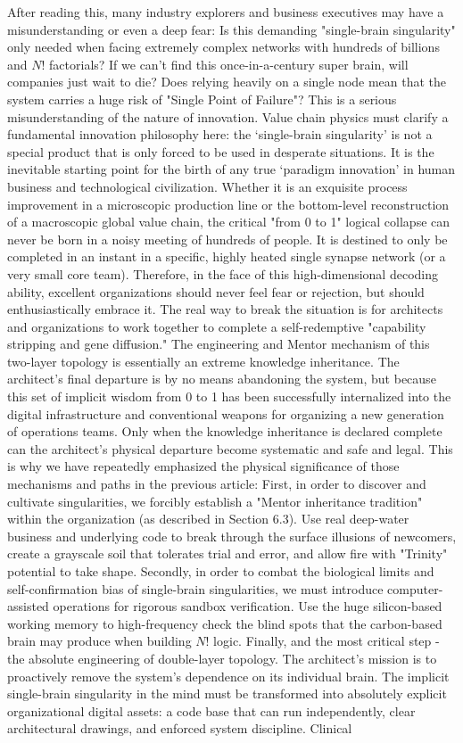 \documentclass[11pt,a4paper]{article}
\begin{document}
After reading this, many industry explorers and business executives may have a misunderstanding or even a deep fear: Is this demanding "single-brain singularity" only needed when facing extremely complex networks with hundreds of billions and $N!$ factorials? If we can’t find this once-in-a-century super brain, will companies just wait to die? Does relying heavily on a single node mean that the system carries a huge risk of "Single Point of Failure"? This is a serious misunderstanding of the nature of innovation. Value chain physics must clarify a fundamental innovation philosophy here: the ‘single-brain singularity’ is not a special product that is only forced to be used in desperate situations. It is the inevitable starting point for the birth of any true ‘paradigm innovation’ in human business and technological civilization. Whether it is an exquisite process improvement in a microscopic production line or the bottom-level reconstruction of a macroscopic global value chain, the critical "from 0 to 1" logical collapse can never be born in a noisy meeting of hundreds of people. It is destined to only be completed in an instant in a specific, highly heated single synapse network (or a very small core team). Therefore, in the face of this high-dimensional decoding ability, excellent organizations should never feel fear or rejection, but should enthusiastically embrace it. The real way to break the situation is for architects and organizations to work together to complete a self-redemptive "capability stripping and gene diffusion." The engineering and Mentor mechanism of this two-layer topology is essentially an extreme knowledge inheritance. The architect's final departure is by no means abandoning the system, but because this set of implicit wisdom from 0 to 1 has been successfully internalized into the digital infrastructure and conventional weapons for organizing a new generation of operations teams. Only when the knowledge inheritance is declared complete can the architect's physical departure become systematic and safe and legal. This is why we have repeatedly emphasized the physical significance of those mechanisms and paths in the previous article: First, in order to discover and cultivate singularities, we forcibly establish a "Mentor inheritance tradition" within the organization (as described in Section 6.3). Use real deep-water business and underlying code to break through the surface illusions of newcomers, create a grayscale soil that tolerates trial and error, and allow fire with "Trinity" potential to take shape. Secondly, in order to combat the biological limits and self-confirmation bias of single-brain singularities, we must introduce computer-assisted operations for rigorous sandbox verification. Use the huge silicon-based working memory to high-frequency check the blind spots that the carbon-based brain may produce when building $N!$ logic. Finally, and the most critical step - the absolute engineering of double-layer topology. The architect's mission is to proactively remove the system's dependence on its individual brain. The implicit single-brain singularity in the mind must be transformed into absolutely explicit organizational digital assets: a code base that can run independently, clear architectural drawings, and enforced system discipline. Clinical 
\end{document}
